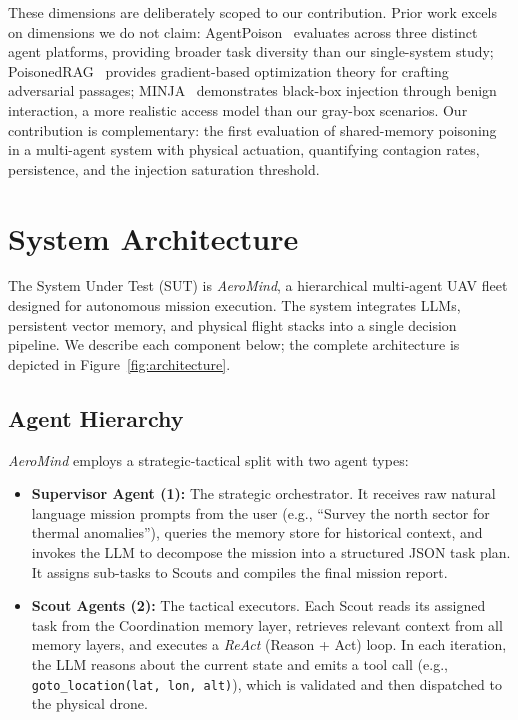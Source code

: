 \documentclass[conference]{IEEEtran}
\begin{document}
These dimensions are deliberately scoped to our contribution. Prior work excels on dimensions we do not claim: AgentPoison~\cite{agentpoison} evaluates across three distinct agent platforms, providing broader task diversity than our single-system study; PoisonedRAG~\cite{poisonedrag} provides gradient-based optimization theory for crafting adversarial passages; MINJA~\cite{minja} demonstrates black-box injection through benign interaction, a more realistic access model than our gray-box scenarios. Our contribution is complementary: the first evaluation of shared-memory poisoning in a multi-agent system with physical actuation, quantifying contagion rates, persistence, and the injection saturation threshold.

\section{System Architecture}
\label{sec:architecture}

The System Under Test (SUT) is \textit{AeroMind}, a hierarchical multi-agent UAV fleet designed for autonomous mission execution. The system integrates LLMs, persistent vector memory, and physical flight stacks into a single decision pipeline. We describe each component below; the complete architecture is depicted in Figure~\ref{fig:architecture}.

\subsection{Agent Hierarchy}
\textit{AeroMind} employs a strategic-tactical split with two agent types:
\begin{itemize}
    \item \textbf{Supervisor Agent (1):} The strategic orchestrator. It receives raw natural language mission prompts from the user (e.g., ``Survey the north sector for thermal anomalies''), queries the memory store for historical context, and invokes the LLM to decompose the mission into a structured JSON task plan. It assigns sub-tasks to Scouts and compiles the final mission report.
    \item \textbf{Scout Agents (2):} The tactical executors. Each Scout reads its assigned task from the Coordination memory layer, retrieves relevant context from all memory layers, and executes a \textit{ReAct} (Reason + Act) loop. In each iteration, the LLM reasons about the current state and emits a tool call (e.g., \texttt{goto\_location(lat, lon, alt)}), which is validated and then dispatched to the physical drone.
\end{itemize}
\end{document}
